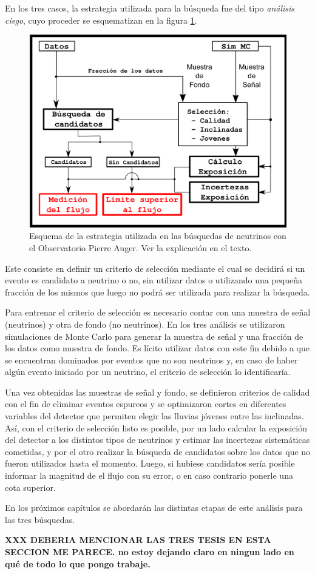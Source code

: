 En los tres casos, la estrategia utilizada para la búsqueda fue del tipo \emph{análisis ciego}, cuyo proceder se esquematizan en la figura \ref{fig:strAuger}.
%
\begin{figure}[ht!]
	\centering
	\includegraphics[width=\textwidth]{./fig/estrategiaAuger/analysisSchema}
	\caption{\label{fig:strAuger}
	Esquema de la estrategia utilizada en las búsquedas de neutrinos con el Observatorio Pierre Auger. Ver la explicación en el texto.
	}
\end{figure}
%
Este consiste en definir un criterio de selección mediante el cual se decidirá si un evento es candidato a neutrino o no, sin utilizar datos o utilizando una pequeña fracción de los mismos que luego no podrá ser utilizada para realizar la búsqueda.

Para entrenar el criterio de selección es necesario contar con una muestra de señal (neutrinos) y otra de fondo (no neutrinos).
En los tres análisis se utilizaron simulaciones de Monte Carlo para generar la muestra de señal y una fracción de los datos como muestra de fondo.
Es lícito utilizar datos con este fin debido a que se encuentran dominados por eventos que no son neutrinos y, en caso de haber algún evento iniciado por un neutrino, el criterio de selección lo identificaría.

Una vez obtenidas las muestras de señal y fondo, se definieron criterios de calidad con el fin de eliminar eventos espureos y se optimizaron cortes en diferentes variables del detector que permiten elegir las lluvias jóvenes entre las inclinadas.
Así, con el criterio de selección listo es posible, por un lado calcular la exposición del detector a los distintos tipos de neutrinos y estimar las incertezas sistemáticas cometidas, y por el otro realizar la búsqueda de candidatos sobre los datos que no fueron utilizados hasta el momento.
Luego, si hubiese candidatos sería posible informar la magnitud de el flujo con su error, o en caso contrario ponerle una cota superior.

En los próximos capítulos se abordarán las distintas etapas de este análisis para las tres búsquedas.

\textbf{XXX DEBERIA MENCIONAR LAS TRES TESIS EN ESTA SECCION ME PARECE. no estoy dejando claro en ningun lado en qué de todo lo que pongo trabaje.}
